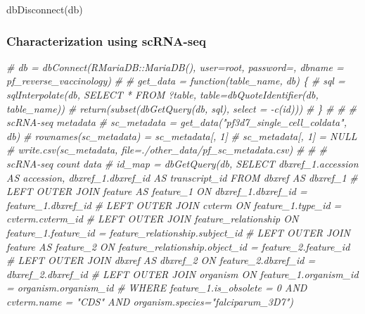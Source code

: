 \documentclass[
  11pt,
  oneside]{book}
\newenvironment{Shaded}{\begin{snugshade}}{\end{snugshade}}
\newcommand{\CommentTok}[1]{\textcolor[rgb]{0.56,0.35,0.01}{\textit{#1}}}
\newcommand{\FunctionTok}[1]{\textcolor[rgb]{0.00,0.00,0.00}{#1}}
\newcommand{\NormalTok}[1]{#1}
\begin{document}
\begin{Shaded}
\begin{Highlighting}[]
\FunctionTok{dbDisconnect}\NormalTok{(db)}
\end{Highlighting}
\end{Shaded}

\hypertarget{characterization-using-scrna-seq}{%
\subsubsection{Characterization using scRNA-seq}\label{characterization-using-scrna-seq}}

\begin{Shaded}
\begin{Highlighting}[]
\CommentTok{\# db = dbConnect(RMariaDB::MariaDB(), user=\textquotesingle{}root\textquotesingle{}, password=\textquotesingle{}\textquotesingle{}, dbname = \textquotesingle{}pf\_reverse\_vaccinology\textquotesingle{})}
\CommentTok{\#}
\CommentTok{\# get\_data = function(table\_name, db) \{}
\CommentTok{\#   sql = sqlInterpolate(db, \textquotesingle{}SELECT * FROM ?table\textquotesingle{}, table=dbQuoteIdentifier(db, table\_name))}
\CommentTok{\#   return(subset(dbGetQuery(db, sql), select = {-}c(id)))}
\CommentTok{\# \}}
\CommentTok{\#}
\CommentTok{\# \# scRNA{-}seq metadata}
\CommentTok{\# sc\_metadata = get\_data("pf3d7\_single\_cell\_coldata", db)}
\CommentTok{\# rownames(sc\_metadata) = sc\_metadata[, 1]}
\CommentTok{\# sc\_metadata[, 1] = NULL}
\CommentTok{\# write.csv(sc\_metadata, file=\textquotesingle{}./other\_data/pf\_sc\_metadata.csv\textquotesingle{})}
\CommentTok{\#}
\CommentTok{\# \# scRNA{-}seq count data}
\CommentTok{\# id\_map = dbGetQuery(db, \textquotesingle{}SELECT dbxref\_1.accession AS accession, dbxref\_1.dbxref\_id AS transcript\_id FROM dbxref AS dbxref\_1}
\CommentTok{\#                          LEFT OUTER JOIN feature AS feature\_1 ON dbxref\_1.dbxref\_id = feature\_1.dbxref\_id}
\CommentTok{\#                          LEFT OUTER JOIN cvterm ON feature\_1.type\_id = cvterm.cvterm\_id}
\CommentTok{\#                          LEFT OUTER JOIN feature\_relationship ON feature\_1.feature\_id = feature\_relationship.subject\_id}
\CommentTok{\#                          LEFT OUTER JOIN feature AS feature\_2 ON feature\_relationship.object\_id = feature\_2.feature\_id}
\CommentTok{\#                          LEFT OUTER JOIN dbxref AS dbxref\_2 ON feature\_2.dbxref\_id = dbxref\_2.dbxref\_id}
\CommentTok{\#                          LEFT OUTER JOIN organism ON feature\_1.organism\_id = organism.organism\_id}
\CommentTok{\#                          WHERE feature\_1.is\_obsolete = 0 AND cvterm.name = "CDS" AND organism.species="falciparum\_3D7"\textquotesingle{})}

\end{Highlighting}
\end{Shaded}
\end{document}
